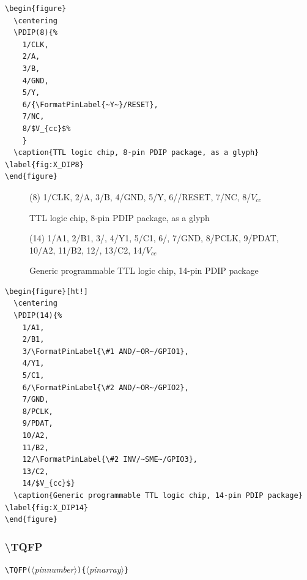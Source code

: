 \documentclass[english,a4paper,10pt]{article}
\newcommand\argu[1]{$\langle$\textit{#1}$\rangle$}
\newcommand\ARGU[1]{\texttt{\{}\argu{#1}\texttt{\}}}
\newcommand\arguD[1]{\texttt{(}\argu{#1}\texttt{)}}
\newcommand\verbinline{\lstinline[basicstyle=\normalsize\ttfamily]}
\begin{document}
\begin{lstlisting}
\begin{figure}
  \centering
  \PDIP(8){%
  	1/CLK,
  	2/A,
  	3/B,
  	4/GND,
  	5/Y,
  	6/{\FormatPinLabel{~Y~}/RESET},
  	7/NC,
  	8/$V_{cc}$%
  	}
  \caption{TTL logic chip, 8-pin PDIP package, as a glyph} \label{fig:X_DIP8}
\end{figure}
\end{lstlisting}%

\begin{figure}[ht!]
  \centering
  \PDIP(8){%
  	1/CLK,
  	2/A,
  	3/B,
  	4/GND,
  	5/Y,
  	6/{/RESET},
  	7/NC,
  	8/$V_{cc}$%
  	}
  \caption{TTL logic chip, 8-pin PDIP package, as a glyph} \label{fig:X_DIP8}
\end{figure}

\begin{figure}[ht!]
  \centering
  \PDIP(14){%
  	1/A1,									
  	2/B1,									
  	3/,		
  	4/Y1,									
  	5/C1,									
  	6/,		
  	7/GND,								
  	8/PCLK,								
  	9/PDAT,								
  	10/A2,								
  	11/B2,								
  	12/,	
  	13/C2,								
  	14/$V_{cc}$}							
  \caption{Generic programmable TTL logic chip, 14-pin PDIP package} \label{fig:X_DIP14}
\end{figure}

\begin{minipage}[t]{0.65\linewidth}
\begin{lstlisting}
\begin{figure}[ht!]
  \centering
  \PDIP(14){%
  	1/A1,										
  	2/B1,										
  	3/\FormatPinLabel{\#1 AND/~OR~/GPIO1},			
  	4/Y1,										
  	5/C1,										
  	6/\FormatPinLabel{\#2 AND/~OR~/GPIO2},			
  	7/GND,									
  	8/PCLK,									
  	9/PDAT,									
  	10/A2,									
  	11/B2,									
  	12/\FormatPinLabel{\#2 INV/~SME~/GPIO3},		
  	13/C2,									
  	14/$V_{cc}$}								
  \caption{Generic programmable TTL logic chip, 14-pin PDIP package} \label{fig:X_DIP14}
\end{figure}
\end{lstlisting}%
\end{minipage}\hfill

\subsubsection{\ttfamily\textbackslash TQFP}
\verbinline|\TQFP|\arguD{pinnumber}\ARGU{pinarray}
\smallskip
\end{document}
